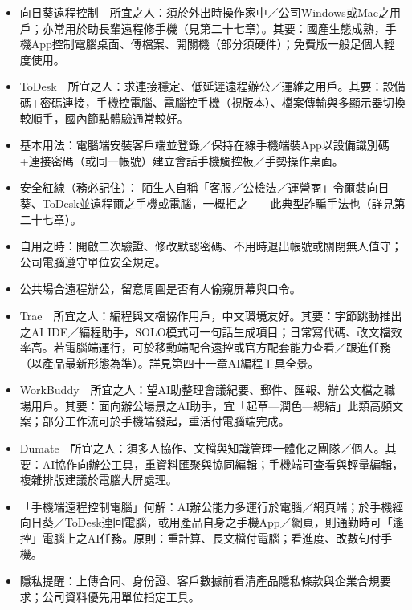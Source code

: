 \begin{itemize}
  \item 向日葵遠程控制　所宜之人：須於外出時操作家中／公司Windows或Mac之用戶；亦常用於助長輩遠程修手機（見第二十七章）。其要：國產生態成熟，手機App控制電腦桌面、傳檔案、開關機（部分須硬件）；免費版一般足個人輕度使用。
  \item ToDesk　所宜之人：求連接穩定、低延遲遠程辦公／運維之用戶。其要：設備碼+密碼連接，手機控電腦、電腦控手機（視版本）、檔案傳輸與多顯示器切換較順手，國內節點體驗通常較好。
  \item 基本用法：電腦端安裝客戶端並登錄／保持在線手機端裝App以設備識別碼+連接密碼（或同一帳號）建立會話手機觸控板／手勢操作桌面。
  \item 安全紅線（務必記住）： 陌生人自稱「客服／公檢法／運營商」令爾裝向日葵、ToDesk並遠程爾之手機或電腦，一概拒之——此典型詐騙手法也（詳見第二十七章）。
  \item 自用之時：開啟二次驗證、修改默認密碼、不用時退出帳號或關閉無人值守；公司電腦遵守單位安全規定。
  \item 公共場合遠程辦公，留意周圍是否有人偷窺屏幕與口令。
\end{itemize}


\begin{itemize}
  \item Trae　所宜之人：編程與文檔協作用戶，中文環境友好。其要：字節跳動推出之AI IDE／編程助手，SOLO模式可一句話生成項目；日常寫代碼、改文檔效率高。若電腦端運行，可於移動端配合遠控或官方配套能力查看／跟進任務（以產品最新形態為準）。詳見第四十一章AI編程工具全景。
  \item WorkBuddy　所宜之人：望AI助整理會議紀要、郵件、匯報、辦公文檔之職場用戶。其要：面向辦公場景之AI助手，宜「起草—潤色—總結」此類高頻文案；部分工作流可於手機端發起，重活付電腦端完成。
  \item Dumate　所宜之人：須多人協作、文檔與知識管理一體化之團隊／個人。其要：AI協作向辦公工具，重資料匯聚與協同編輯；手機端可查看與輕量編輯，複雜排版建議於電腦大屏處理。
  \item 「手機端遠程控制電腦」何解：AI辦公能力多運行於電腦／網頁端；於手機經向日葵／ToDesk連回電腦，或用產品自身之手機App／網頁，則通勤時可「遙控」電腦上之AI任務。原則：重計算、長文檔付電腦；看進度、改數句付手機。
  \item 隱私提醒：上傳合同、身份證、客戶數據前看清產品隱私條款與企業合規要求；公司資料優先用單位指定工具。
\end{itemize}

